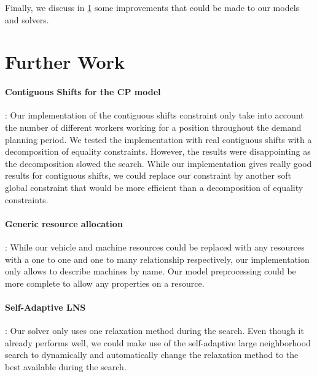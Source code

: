 \documentclass[../thesis.tex]{subfiles}
\begin{document}
Finally, we discuss in \ref{further-work} some improvements that could be made to our models and solvers.

\section{Further Work}
\label{further-work}

\paragraph{Contiguous Shifts for the CP model}: Our implementation of the contiguous shifts constraint only take into account 
the number of different workers working for a position throughout the demand planning period.
We tested the implementation with real contiguous shifts with a decomposition of equality constraints. However, the results 
were disappointing as the decomposition slowed the search. While our implementation gives really good results for contiguous shifts,
we could replace our constraint by another soft global constraint that would be more efficient than 
a decomposition of equality constraints.

\paragraph{Generic resource allocation}: While our vehicle and machine resources could be replaced with 
any resources with a one to one and one to many relationship respectively, our implementation only allows to describe
machines by name. Our model preprocessing could be more complete to allow any properties on a resource.

\paragraph{Self-Adaptive LNS}: Our solver only uses one relaxation method during the search. 
Even though it already performs well, we could make 
use of the self-adaptive large neighborhood search \cite{thomas:adaptive} to dynamically 
and automatically change the relaxation method to the best available during the search.
\end{document}

